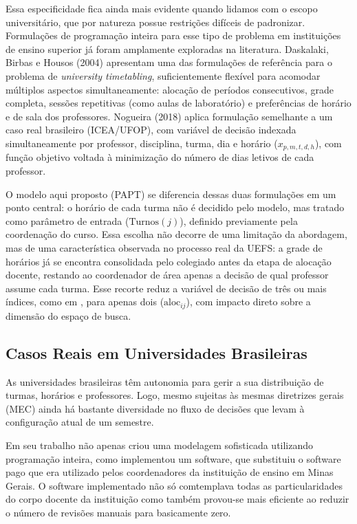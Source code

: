 \documentclass[11pt,a4paper]{article}
\begin{document}
Essa especificidade fica ainda mais evidente quando lidamos com o escopo universitário, que por natureza possue restrições difíceis de padronizar. Formulações de programação inteira para esse tipo de problema em instituições de ensino superior já foram amplamente exploradas na literatura. Daskalaki, Birbas e Housos (2004) \cite{daskalaki2004} apresentam uma das formulações de referência para o problema de \emph{university timetabling}, suficientemente flexível para acomodar múltiplos aspectos simultaneamente: alocação de períodos consecutivos, grade completa, sessões repetitivas (como aulas de laboratório) e preferências de horário e de sala dos professores. Nogueira (2018) \cite{nogueira2018} aplica formulação semelhante a um caso real brasileiro (ICEA/UFOP), com variável de decisão indexada simultaneamente por
professor, disciplina, turma, dia e horário ($x_{p,m,t,d,h}$), com função objetivo voltada à minimização do número de dias letivos de cada professor.

O modelo aqui proposto (PAPT) se diferencia dessas duas formulações em um
ponto central: o horário de cada turma não é decidido pelo modelo, mas tratado como parâmetro de entrada ($\text{Turnos}(j)$), definido previamente pela coordenação do curso. Essa escolha não decorre de uma limitação da abordagem, mas de uma característica observada no processo real da UEFS: a grade de horários já se encontra consolidada pelo colegiado antes da etapa de alocação docente, restando ao coordenador
de área apenas a decisão de qual professor assume cada turma. Esse recorte reduz a variável de decisão de três ou mais índices, como em \cite{nogueira2018}, para apenas dois ($\mathrm{aloc}_{ij}$), com impacto direto sobre a dimensão do espaço de busca.

\subsection{Casos Reais em Universidades Brasileiras}

As universidades brasileiras têm autonomia para gerir a sua distribuição de turmas, horários e professores. Logo, mesmo sujeitas às mesmas diretrizes gerais (MEC) ainda há bastante diversidade no fluxo de decisões que levam à configuração atual de um semestre.

Em seu trabalho \cite{modesto2025} não apenas criou uma modelagem sofisticada utilizando programação inteira, como implementou um software, que substituiu o software pago que era utilizado pelos coordenadores da instituição de ensino em Minas Gerais. O software implementado não só comtemplava todas as particularidades do corpo docente da instituição como também provou-se mais eficiente ao reduzir o número de revisões manuais para basicamente zero. 
\end{document}
